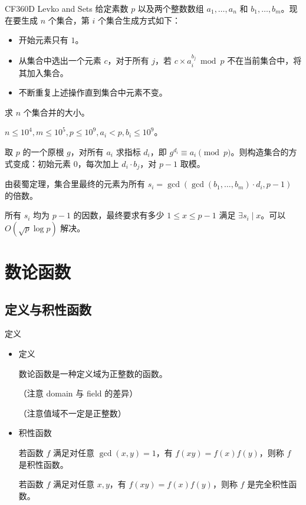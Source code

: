 \documentclass [hyperref={bookmarksdepth=4}, aspectratio=169] {beamer}
\theoremstyle {fy}
\begin{document}
\begin{frame}{CF360D Levko and Sets}
给定素数 $p$ 以及两个整数数组 $a_1,\dots,a_n$ 和 $b_1,\dots,b_m$。现在要生成 $n$ 个集合，第 $i$ 个集合生成方式如下：

\begin{itemize}
    \item 开始元素只有 $1$。
    \item 从集合中选出一个元素 $c$，对于所有 $j$，若 $c\times a_i^{b_j}\bmod p$ 不在当前集合中，将其加入集合。
    \item 不断重复上述操作直到集合中元素不变。
\end{itemize}

求 $n$ 个集合并的大小。

$n\le 10^4,m\le 10^5,p\le 10^9,a_i<p,b_i\le 10^9$。

取 $p$ 的一个原根 $g$，对所有 $a_i$ 求指标 $d_i$，即 $g^{d_i}\equiv a_i\pmod p$。则构造集合的方式变成：初始元素 $0$，每次加上 $d_i\cdot b_j$，对 $p-1$ 取模。

由裴蜀定理，集合里最终的元素为所有 $s_i=\gcd(\gcd(b_1,\dots,b_m)\cdot d_i,p-1)$ 的倍数。

所有 $s_i$ 均为 $p-1$ 的因数，最终要求有多少 $1\le x\le p-1$ 满足 $\exists s_i\mid x$。可以 $O(\sqrt{p}\log p)$ 解决。
\end{frame}

\section{数论函数}

\subsection{定义与积性函数}

\begin{frame}{定义}
\begin{itemize}
    \item 定义

  数论函数是一种定义域为正整数的函数。

  （注意 domain 与 field 的差异）

  （注意值域不一定是正整数）

    \item 积性函数

  若函数 $f$ 满足对任意 $\gcd(x,y)=1$，有 $f(xy)=f(x)f(y)$，则称 $f$ 是积性函数。

  若函数 $f$ 满足对任意 $x,y$，有 $f(xy)=f(x)f(y)$，则称 $f$ 是完全积性函数。
\end{itemize}
\end{frame}
\end{document}
